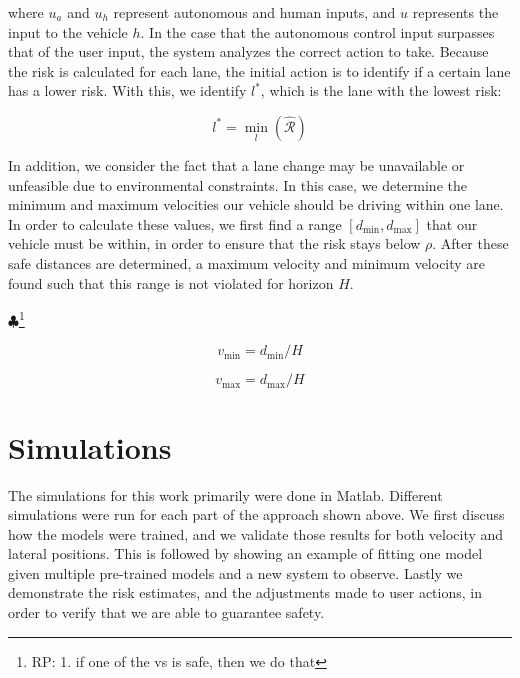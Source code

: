 \documentclass[letterpaper, 10 pt, conference]{ieeeconf}  %
\newcommand\RP[1]{$\clubsuit$\footnote{RP: #1}}
\begin{document}
where $u_a$ and $u_h$ represent autonomous and human inputs, and $u$ represents the input to the vehicle $h$. In the case that the autonomous control input surpasses that of the user input, the system analyzes the correct action to take. Because the risk is calculated for each lane, the initial action is to identify if a certain lane has a lower risk. With this, we identify $l^*$, which is the lane with the lowest risk:

\begin{equation}
    l^* = \min_l(\mathcal{\hat{R}})
\end{equation}

In addition, we consider the fact that a lane change may be unavailable or unfeasible due to environmental constraints. In this case, we determine the minimum and maximum velocities our vehicle should be driving within one lane. In order to calculate these values, we first find a range $[d_{\min},d_{\max}]$ that our vehicle must be within, in order to ensure that the risk stays below $\rho$. After these safe distances are determined, a maximum velocity and minimum velocity are found such that this range is not violated for horizon $H$.

\RP{1. if one of the vs is safe, then we do that}

\begin{equation}
    v_{\min} = d_{\min}/H
\end{equation}

\begin{equation}
    v_{\max} = d_{\max}/H
\end{equation}



\section{Simulations} \label{sec:sims}
The simulations for this work primarily were done in Matlab. Different simulations were run for each part of the approach shown above. We first discuss how the models were trained, and we validate those results for both velocity and lateral positions. This is followed by showing an example of fitting one model given multiple pre-trained models and a new system to observe. Lastly we demonstrate the risk estimates, and the adjustments made to user actions, in order to verify that we are able to guarantee safety.
\end{document}
